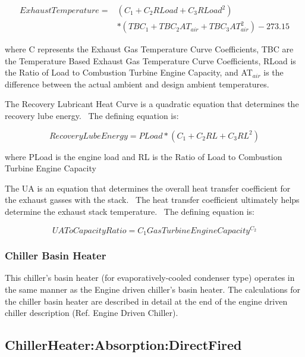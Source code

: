\begin{equation}
\begin{split}
ExhaustTemperature =& ({C_1} + {C_2}RLoad + {C_3}RLoa{d^2}) \\
&* (TB{C_1} + TB{C_2}A{T_{air}} + TB{C_3}AT_{air}^2) - 273.15
\end{split}
\end{equation}

where C represents the Exhaust Gas Temperature Curve Coefficients, TBC are the Temperature Based Exhaust Gas Temperature Curve Coefficients, RLoad is the Ratio of Load to Combustion Turbine Engine Capacity, and AT\(_{air}\) is the difference between the actual ambient and design ambient temperatures.

The Recovery Lubricant Heat Curve is a quadratic equation that determines the recovery lube energy.~ The defining equation is:

\begin{equation}
RecoveryLubeEnergy = PLoad * ({C_1} + {C_2}RL + {C_3}R{L^2})
\end{equation}

where PLoad is the engine load and RL is the Ratio of Load to Combustion Turbine Engine Capacity

The UA is an equation that determines the overall heat transfer coefficient for the exhaust gasses with the stack.~ The heat transfer coefficient ultimately helps determine the exhaust stack temperature.~ The defining equation is:

\begin{equation}
UAToCapacityRatio = {C_1}GasTurbineEngineCapacit{y^{{C_2}}}
\end{equation}

\subsubsection{Chiller Basin Heater}\label{chiller-basin-heater}

This chiller's basin heater (for evaporatively-cooled condenser type) operates in the same manner as the Engine driven chiller's basin heater. The calculations for the chiller basin heater are described in detail at the end of the engine driven chiller description (Ref. Engine Driven Chiller).

\subsection{ChillerHeater:Absorption:DirectFired}\label{chillerheaterabsorptiondirectfired}

